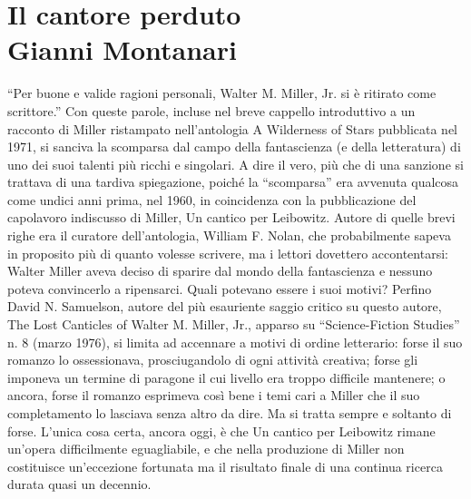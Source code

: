 { \chapter*{Il cantore perduto\\{\footnotesize Gianni Montanari}}}
“Per buone e valide ragioni personali, Walter M. Miller, Jr. si è ritirato come scrittore.” Con queste parole, incluse nel breve cappello introduttivo a un racconto di Miller ristampato nell'antologia A Wilderness of Stars pubblicata nel 1971, si sanciva la scomparsa dal campo della fantascienza (e della letteratura) di uno dei suoi talenti più ricchi e singolari. A dire il vero, più che di una sanzione si trattava di una tardiva spiegazione, poiché la “scomparsa” era avvenuta qualcosa come undici anni prima, nel 1960, in coincidenza con la pubblicazione del capolavoro indiscusso di Miller, Un cantico per Leibowitz. Autore di quelle brevi righe era il curatore dell'antologia, William F. Nolan, che probabilmente sapeva in proposito più di quanto volesse scrivere, ma i lettori dovettero accontentarsi: Walter Miller aveva deciso di sparire dal mondo della fantascienza e nessuno poteva convincerlo a ripensarci.
Quali potevano essere i suoi motivi? Perfino David N. Samuelson, autore del più esauriente saggio critico su questo autore, The Lost Canticles of Walter M. Miller, Jr., apparso su “Science-Fiction Studies” n. 8 (marzo 1976), si limita ad accennare a motivi di ordine letterario: forse il suo romanzo lo ossessionava, prosciugandolo di ogni attività creativa; forse gli imponeva un termine di paragone il cui livello era troppo difficile mantenere; o ancora, forse il romanzo esprimeva così bene i temi cari a Miller che il suo completamento lo lasciava senza altro da dire. Ma si tratta sempre e soltanto di forse. L'unica cosa certa, ancora oggi, è che Un cantico per Leibowitz rimane un'opera difficilmente eguagliabile, e che nella produzione di Miller non costituisce un'eccezione fortunata ma il risultato finale di una continua ricerca durata quasi un decennio.
